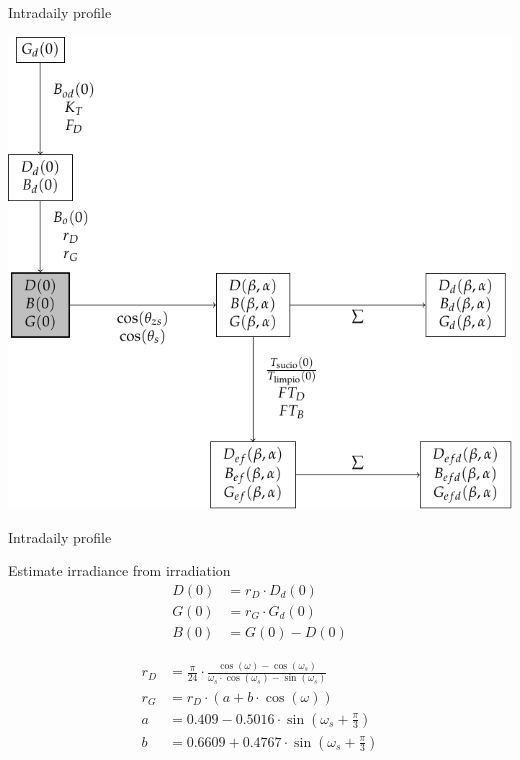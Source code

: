 \documentclass[xcolor={usenames,svgnames,dvipsnames}]{beamer}
\begin{document}
\begin{frame}[label={sec:orgf56d9aa}]{Intradaily profile}
\begin{center}
\includegraphics[width=.9\linewidth]{../figs/ProcedimientoCalculoRadiacionInclinada_perfil.pdf}
\end{center}
\end{frame}

\begin{frame}[label={sec:orgdf5765b}]{Intradaily profile}
\begin{block}{Estimate irradiance from irradiation}
\begin{align*}
  D(0) &= r_D \cdot D_d(0)\\
  G(0) &= r_G \cdot G_d(0)\\
  B(0) &= G(0) - D(0)
\end{align*}

\begin{align*}
  r_{D} &= \frac{\pi}{24}\cdot\frac{\cos(\omega)-\cos(\omega_{s})}{\omega_{s}\cdot\cos(\omega_{s})-\sin(\omega_{s})}\\
  r_{G} &= r_{D}\cdot(a+b\cdot\cos(\omega))\\
  a &= 0.409-0.5016\cdot\sin(\omega_{s}+\frac{\pi}{3})\\
  b &=0.6609+0.4767\cdot\sin(\omega_{s}+\frac{\pi}{3})
\end{align*}
\end{block}
\end{frame}
\end{document}
